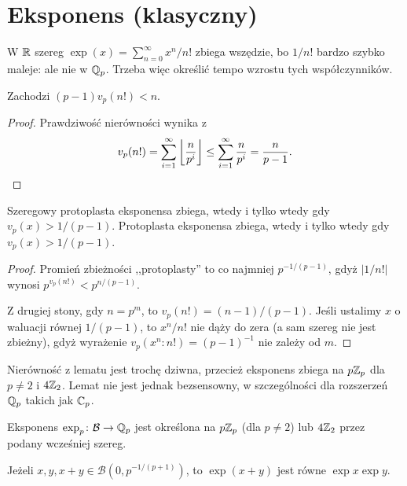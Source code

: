 \section{Eksponens (klasyczny)}
W  $\mathbb R$ szereg $\exp(x) = \sum_{n = 0}^\infty x^n/n!$ zbiega wszędzie, bo $1/n!$ bardzo szybko maleje: ale nie w $\mathbb Q_p$.
Trzeba więc określić tempo wzrostu tych współczynników.

\begin{lemat}
	Zachodzi $(p-1) v_p(n!) < n$.
\end{lemat}

\begin{proof}
	Prawdziwość nierówności wynika z
	\[
		v_p(n!) = \sum_{i = 1}^\infty \left \lfloor \frac n {p^i} \right \rfloor \le \sum_{i = 1}^\infty \frac n {p^i} = \frac n {p-1}. \qedhere
	\]
\end{proof}

\begin{lemat}
	Szeregowy protoplasta eksponensa zbiega, wtedy i tylko wtedy gdy $v_p(x) > 1 / (p-1)$. 
 	Protoplasta eksponensa zbiega, wtedy i tylko wtedy gdy $v_p(x) > 1 / (p-1)$. 
\end{lemat}

\begin{proof}
	Promień zbieżności ,,protoplasty'' to co najmniej $p^{-1/(p-1)}$, gdyż $|1/n!|$ wynosi $p^{v_p(n!)} < p^{n/(p-1)}$.
	
	Z drugiej stony, gdy $n = p^m$, to $v_p(n!) = (n-1)/(p-1)$.
	Jeśli ustalimy $x$ o waluacji równej $1 / (p-1)$, to $x^n/n!$ nie dąży do zera (a sam szereg nie jest zbieżny), gdyż wyrażenie $v_p(x^n : n!) = (p-1)^{-1}$ nie zależy od $m$.
\end{proof}

Nierówność z lematu jest trochę dziwna, przecież eksponens zbiega na $p \mathbb Z_p$ dla $p \neq 2$ i $4\mathbb Z_2$.
Lemat nie jest jednak bezsensowny, w szczególności dla rozszerzeń $\mathbb Q_p$ takich jak $\mathbb C_p$.

\begin{definicja}
	Eksponens $\exp_p \colon \mathcal B \to \mathbb Q_p$ jest określona na $p\mathbb Z_p$ (dla $p \neq 2$) lub $4\mathbb Z_2$ przez podany wcześniej szereg.
\end{definicja}

\begin{fakt}
	Jeżeli $x, y, x+y \in \mathcal B(0, p^{-1/(p+1)})$, to $\exp(x+y)$ jest równe $\exp x \exp y$.
\end{fakt}


